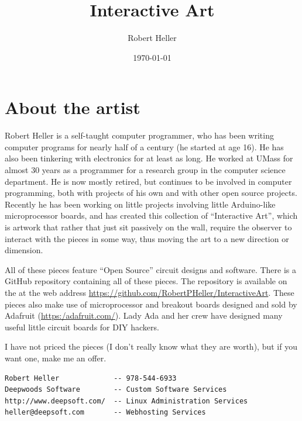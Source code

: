\documentclass[12pt]{article}
\title{Interactive Art}
\author{Robert Heller}
\date{\today}
\begin{document}
\maketitle


\section*{About the artist}

Robert Heller is a self-taught computer programmer, who has been writing 
computer programs for nearly half of a century (he started at age 16).  He has 
also been tinkering with electronics for at least as long.  He worked at UMass 
for almost 30 years as a programmer for a research group in the computer 
science department.  He is now mostly retired, but continues to be involved in 
computer programming, both with projects of his own and with other open source 
projects.  Recently he has been working on little projects involving 
little Arduino-like microprocessor boards, and has created this collection of 
``Interactive Art'', which is artwork that rather that just sit passively on 
the wall, require the observer to interact with the pieces in some way, thus 
moving the art to a new direction or dimension.

All of these pieces feature ``Open Source'' circuit designs and software.
There is a GitHub repository containing all of these pieces. The repository is
available on the at the web address
\url{https://github.com/RobertPHeller/InteractiveArt}.
These pieces also make use of microprocessor and breakout boards designed and
sold by Adafruit
(\url{https:/adafruit.com/}). Lady
Ada and her crew have designed many useful little circuit boards for DIY
hackers.

I have not priced the pieces (I don't really know what they are worth), but if 
you want one, make me an offer.

\begin{verbatim}
Robert Heller             -- 978-544-6933
Deepwoods Software        -- Custom Software Services
http://www.deepsoft.com/  -- Linux Administration Services
heller@deepsoft.com       -- Webhosting Services
\end{verbatim}









%
\end{document}
